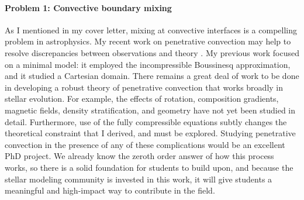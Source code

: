 \documentclass[12pt]{article}
\begin{document}
\paragraph*{Problem 1: Convective boundary mixing}
As I mentioned in my cover letter, mixing at convective interfaces is a compelling problem in astrophysics.
My recent work on penetrative convection may help to resolve discrepancies between observations and theory \citep{anders_etal_2022a}.
My previous work focused on a minimal model: it employed the incompressible Boussinesq approximation, and it studied a Cartesian domain.
There remains a great deal of work to be done in developing a robust theory of penetrative convection that works broadly in stellar evolution.
For example, the effects of rotation, composition gradients, magnetic fields, density stratification, and geometry have not yet been studied in detail.
Furthermore, use of the fully compressible equations subtly changes the theoretical constraint that I derived, and must be explored.
Studying penetrative convection in the presence of any of these complications would be an excellent PhD project.
We already know the zeroth order answer of how this process works, so there is a solid foundation for students to build upon, and because the stellar modeling community is invested in this work, it will give students a meaningful and high-impact way to contribute in the field.

\end{document}
